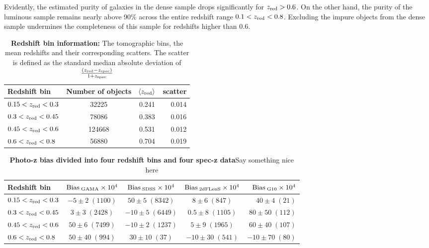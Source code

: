 \documentclass[fleqn,usenatbib,useAMS]{mnras}
\begin{document}
Evidently, the estimated purity of galaxies in the dense sample drops significantly for $z_{\rm red}>0.6$. On the other hand, the purity of the luminous sample remains nearly above 90\% across the entire redshift range $0.1<z_{\rm red}<0.8$. Excluding the impure objects from the dense sample undermines the completeness of this sample for redshifts higher than 0.6. 

\begin{table}
	\centering
	\caption{{\bf Redshift bin information:} 
    The tomographic bins, the mean redshifts and their corresponding scatters. The scatter is defined as the standard median absolute deviation of $\frac{(z_{\rm red} - z_{\rm spec})}{1+z_{\rm spec}}$}
	\label{tab:pz}
	\begin{tabularx}{\columnwidth}{lccr} %
		\hline
		Redshift bin &  Number of objects & $\langle z_{\rm red} \rangle$ & scatter \\
		\hline
		$0.15 <z_{\rm red}<0.3$  & 32225  & 0.241 &  0.014  \\
		$0.3  <z_{\rm red}<0.45$ & 78086  & 0.383 &  0.016  \\
        $0.45 <z_{\rm red}<0.6$  & 124668 & 0.531&  0.012  \\
        $0.6  <z_{\rm red}<0.8$  & 56880  & 0.704 &  0.019 \\
		\hline
	\end{tabularx}
\end{table}


\begin{table}
	\centering
	\caption{{\bf Photo-z bias divided into four redshift bins and four spec-z data}Say something nice here}
	\label{tab:student-t}
	\begin{tabularx}{0.75\textwidth}{lcccr} %
		\hline
		Redshift bin & $\rm Bias_{\; GAMA} \times 10^{4}$ &  $\rm Bias_{\; SDSS}\times 10^{4}$ &  $\rm Bias_{\; 2dFLenS}\times 10^{4}$ &  $\rm Bias_{\; G10}\times 10^{4}$ \\
		\hline
		$0.15 <z_{\rm red}<0.3$  & $-5\pm 2 \; (1100)$  & $50\pm 5 \;(8342)$  & $8 \pm 6 \;(847)$  & $40 \pm 4 \;(21)$ \\
		$0.3  <z_{\rm red}<0.45$ & $3 \pm 3 \;(2428)$  & $-10 \pm 5 \;(6449)$  & $0.5 \pm8 \;(1105)$  & $80 \pm 50 \;(112)$ \\
        $0.45 <z_{\rm red}<0.6$  & $50\pm6 \;(7499)$  & $-10 \pm2 \;(1237)$ & $5 \pm9\; (1965)$ & $60 \pm40\;(107)$ \\
        $0.6  <z_{\rm red}<0.8$   & $50\pm40\;(994)$  & $30 \pm10\;(37)$ & $-10\pm30\;(541)$ & $-10 \pm70\;(80)$  \\
		\hline
	\end{tabularx}
\end{table}
\end{document}
